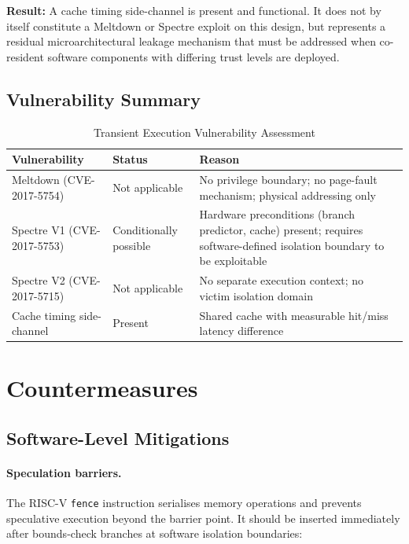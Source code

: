 \textbf{Result:} A cache timing side-channel is present and functional.  It does not
by itself constitute a Meltdown or Spectre exploit on this design, but represents a
residual microarchitectural leakage mechanism that must be addressed when co-resident
software components with differing trust levels are deployed.

\subsection{Vulnerability Summary}

\begin{table}[h]
\centering
\caption{Transient Execution Vulnerability Assessment}
\label{tab:vuln_summary}
\begin{tabular}{llp{7cm}}
\hline
\textbf{Vulnerability} & \textbf{Status} & \textbf{Reason} \\
\hline
Meltdown (CVE-2017-5754)     & Not applicable        & No privilege boundary; no page-fault mechanism; physical addressing only \\
Spectre V1 (CVE-2017-5753)   & Conditionally possible & Hardware preconditions (branch predictor, cache) present; requires software-defined isolation boundary to be exploitable \\
Spectre V2 (CVE-2017-5715)   & Not applicable        & No separate execution context; no victim isolation domain \\
Cache timing side-channel     & Present               & Shared cache with measurable hit/miss latency difference \\
\hline
\end{tabular}
\end{table}

\section{Countermeasures}

\subsection{Software-Level Mitigations}

\paragraph{Speculation barriers.}
The RISC-V \texttt{fence} instruction serialises memory operations and prevents
speculative execution beyond the barrier point.  It should be inserted immediately
after bounds-check branches at software isolation boundaries:

